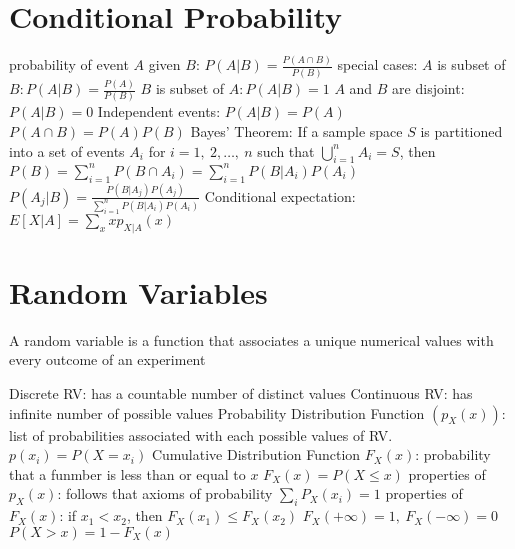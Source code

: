 \documentclass[a4paper,11pt]{article}
\begin{document}
	\section{Conditional Probability}
	\begin{outline}[enumerate]
		\1 probability of event $A$ given $B$: $P\left(A | B\right) = \frac{P\left(A \cap B\right)}{P\left(B\right)}$
		\1 special cases:
		\2 $A$ is subset of $B: P\left(A | B\right) = \frac{P\left(A\right)}{P\left(B\right)}$
		\2 $B$ is subset of $A: P\left(A | B\right) = 1$
		\2 $A$ and $B$ are disjoint: $P\left(A | B\right) = 0$
		\1 Independent events: $P\left(A | B\right) = P\left(A\right)$ 
		\2 $P\left(A \cap B\right) = P\left(A\right)P\left(B\right)$
		\1 Bayes' Theorem: If a sample space $S$ is partitioned into a set of events $A_{i}$ for $i = 1,~2,\ldots,~n$ such that $\bigcup_{i=1}^{n} A_{i} = S$, then $P\left(B\right) = \sum_{i = 1}^{n}P\left(B \cap A_{i}\right) = \sum_{i = 1}^{n}P\left(B | A_{i}\right)P\left(A_{i}\right) $	
		\1 $P\left(A_{j} | B\right) = \frac{P\left(B | A_{j}\right)P\left(A_{j}\right)}{\sum_{i = 1}^{n}P\left(B | A_{i}\right)P\left(A_{i}\right)}$
		\1 Conditional expectation: $E\left[X | A\right] = \sum_{x} xp_{X | A} \left(x\right)$
	\end{outline}
	
	\section{Random Variables}
	A random variable is a function that associates a unique numerical values with every outcome of an experiment
	\begin{outline}[enumerate]
		\1 Discrete RV: has a countable number of distinct values
		\1 Continuous RV: has infinite number of possible values
		\1 Probability Distribution Function $(p_X(x))$: list of probabilities associated with each possible values of RV. 
		\1 $p(x_{i}) = P(X = x_{i})$ 
		\1 Cumulative Distribution Function $F_X(x)$: probability that a funmber is less than or equal to $x$ 
		\1 $F_X(x) = P(X \leq x)$
		\1 properties of $p_{X}(x)$:
			\2 follows that axioms of probability
			\2 $\sum_{i} P_X(x_{i}) = 1$
		\1 properties of $F_{X}(x)$:
			\2 if $x_{1} < x_{2}$, then $F_{X}(x_{1}) \leq F_{X}(x_{2})$
			\2 $F_{X}(+\infty) = 1,~ F_{X}(-\infty) = 0$
			\2 $P(X > x) = 1 - F_{X}(x)$
	\end{outline}
\end{document}

